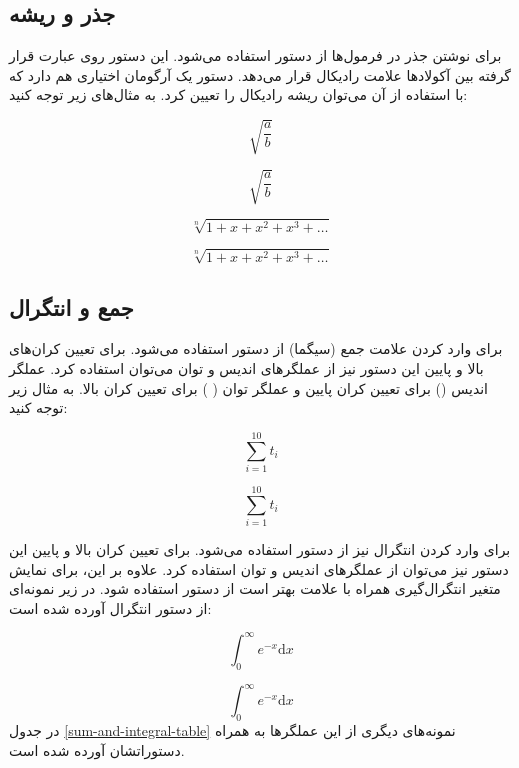 \subsection{جذر و ریشه}
برای نوشتن جذر در فرمول‌ها از دستور  استفاده می‌شود. این
دستور روی عبارت قرار گرفته بین آکولادها علامت رادیکال قرار می‌دهد.
دستور  یک آرگومان اختیاری هم دارد که با استفاده از آن
می‌توان ریشه رادیکال را تعیین کرد. به مثال‌های زیر توجه کنید:
\begin{latex}
\[
\sqrt{\frac{a}{b}}
\]
\end{latex}
\[
\sqrt{\frac{a}{b}}
\]
\begin{latex}
\[
\sqrt[n]{1+x+x^2+x^3+\ldots}
\]
\end{latex}
\[
\sqrt[n]{1+x+x^2+x^3+\ldots}
\]
	
\subsection{جمع و انتگرال}
برای وارد کردن علامت جمع (سیگما) از دستور  استفاده
می‌شود. برای تعیین کران‌های بالا و پایین این دستور نیز از عملگرهای اندیس و
توان می‌توان استفاده کرد. عملگر اندیس (\lr{$\_$}) برای تعیین کران پایین و عملگر
توان ( \lr{$\^$} ) برای تعیین کران بالا. به مثال زیر توجه کنید:

\begin{latex}
\[
 \sum_{i=1}^{10} t_i
\]
\end{latex}
\[
 \sum_{i=1}^{10} t_i
\]

برای وارد کردن انتگرال نیز از دستور  استفاده می‌شود. برای
تعیین کران بالا و پایین این دستور نیز می‌توان از عملگرهای اندیس و توان استفاده
کرد. علاوه بر این، برای نمایش متغیر انتگرال‌گیری همراه با علامت  بهتر
است از دستور  استفاده شود. در زیر نمونه‌ای از
دستور انتگرال آورده شده است:
\begin{latex}
\[
 \int_0^\infty e^{-x} \mathrm{d}x
\]
\end{latex}
\[
 \int_0^\infty e^{-x} \mathrm{d}x
\]
در جدول \ref{sum-and-integral-table} نمونه‌های دیگری از این عملگرها به همراه
دستوراتشان آورده شده است.

